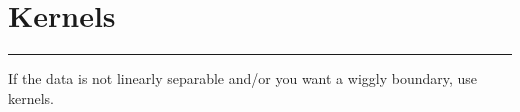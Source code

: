\section{Kernels}
\smallskip \hrule height 2pt \smallskip
If the data is not linearly separable and/or you want a wiggly boundary, use kernels. 


